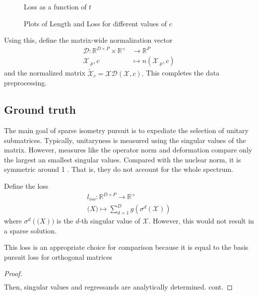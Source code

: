 \documentclass[a4paper,11pt]{article}
\begin{document}
\begin{figure}[htbp]
\begin{minipage}{0.49\textwidth}
        \caption{Loss as a function of $t$}
        \label{fig:loss}
    \end{minipage}
    \caption{Plots of Length and Loss for different values of $c$}
    \label{fig:results}
\end{figure}


Using this, define the matrix-wide normalization vector
\begin{align}
\mathcal D: \mathbb R^{D \times P} \times \mathbb R^+ &\to \mathbb R^P \\
\mathcal X_{.p}, c &\mapsto n(\mathcal X_{.p}, c)
\end{align}
and the normalized matrix $\tilde {\mathcal X}_c = \mathcal X \mathcal D(\mathcal X, c).$
This completes the data preprocessing.

\subsection{Ground truth}

The main goal of sparse isometry pursuit is to expediate the selection of unitary submatrices.
Typically, unitaryness is measured using the singular values of the matrix.
However, measures like the operator norm and deformation compare only the largest an smallest singular values.
Compared with the nuclear norm, it is symmetric around 1 \cite{Fazel2001ARM}. %
That is, they do not account for the whole spectrum.

Define the loss
\begin{align}
l_{iso}: \mathbb R^{D \times P} \to \mathbb R^{+} \\
\mathcal (X) \mapsto \sum_{d = 1}^D g(\sigma^d(\mathcal X))
\end{align}
where $\sigma^d (\mathcal (X))$ is the $d$-th singular value of $\mathcal X$.
However, this would not result in a sparse solution.

This loss is an appropriate choice for comparison because it is equal to the basis pursuit loss for orthogonal matrices
\begin{proposition}
\label{prop:main}
\end{proposition}
\begin{proof}
\begin{align}
\end{align}
Then, singular values and regressands are analytically determined.  cont.
\end{proof}
\end{document}

